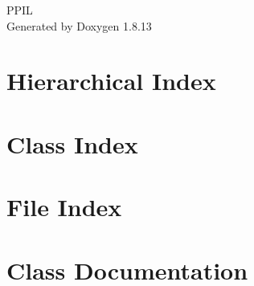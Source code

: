 \documentclass[twoside]{book}
\newcommand{\+}{\discretionary{\mbox{\scriptsize$\hookleftarrow$}}{}{}}
\newcommand{\clearemptydoublepage}{%
  \newpage{\pagestyle{empty}\cleardoublepage}%
}
\begin{document}
\hypersetup{pageanchor=false,
             bookmarksnumbered=true,
             pdfencoding=unicode
            }
\begin{titlepage}
\vspace*{7cm}
\begin{center}%
{\Large P\+P\+IL }\\
\vspace*{1cm}
{\large Generated by Doxygen 1.8.13}\\
\end{center}
\end{titlepage}
\clearemptydoublepage
{}
\tableofcontents
\clearemptydoublepage
{}
\hypersetup{pageanchor=true}

\chapter{Hierarchical Index}

\chapter{Class Index}

\chapter{File Index}

\chapter{Class Documentation}





















\end{document}
